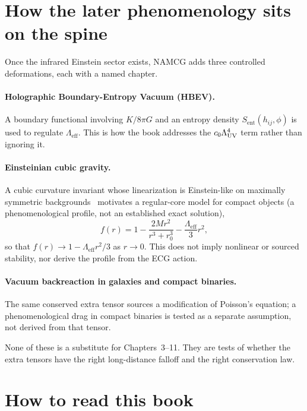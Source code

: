 \section{How the later phenomenology sits on the spine}
\label{sec:ch1-pheno}

Once the infrared Einstein sector exists, NAMCG adds three controlled
deformations, each with a named chapter.

\paragraph{Holographic Boundary-Entropy Vacuum (HBEV).}
A boundary functional involving \(K/8\pi G\) and an entropy density
\(S_{\mathrm{ent}}(h_{ij},\phi)\) is used to regulate
\(\Lambda_{\mathrm{eff}}\). This is how the book addresses the
\(c_0\Lambda_{\mathrm{UV}}^4\) term rather than ignoring it.

\paragraph{Einsteinian cubic gravity.}
A cubic curvature invariant whose linearization is Einstein-like on
maximally symmetric backgrounds~\cite{Bueno2016ECG} motivates a
regular-core model for compact objects (a phenomenological profile,
not an established exact solution),
\begin{equation}
  \label{eq:fr-preview}
  f(r)=1-\frac{2Mr^2}{r^3+r_0^3}-\frac{\Lambda_{\mathrm{eff}}}{3}r^2,
\end{equation}
so that \(f(r)\to 1-\Lambda_{\mathrm{eff}}r^2/3\) as \(r\to 0\).
This does not imply nonlinear or sourced stability, nor derive the
profile from the ECG action.

\paragraph{Vacuum backreaction in galaxies and compact binaries.}
The same conserved extra tensor sources a modification of Poisson's
equation; a phenomenological drag in compact binaries is tested as a
separate assumption, not derived from that tensor.

None of these is a substitute for Chapters~3--11. They are tests of
whether the extra tensors have the right long-distance falloff and the
right conservation law.

\section{How to read this book}
\label{sec:ch1-howto}

